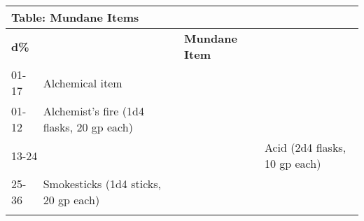 \vspace{12pt}
\begin{longtable}{llll}
\hline
\multicolumn{2}{|p{4.033in}|}{\begin{minipage}[t]{4.033in}\raggedright
\textbf{Table: Mundane Items}\end{minipage}}\\
\hline
\multicolumn{2}{p{0.139in}|}{\begin{minipage}[t]{0.139in}\raggedright
\textbf{d\%}\end{minipage}} & \multicolumn{1}{|p{0.896in}|}{\begin{minipage}[t]{0.896in}\raggedright
\textbf{Mundane Item}\end{minipage}}\\
\hline
\multicolumn{1}{p{3.137in}|}{\begin{minipage}[t]{3.137in}\raggedright
01-17\end{minipage}} & \multicolumn{1}{p{0.069in}|}{\begin{minipage}[t]{0.069in}\raggedright
Alchemical item\end{minipage}}\\
\hline
\multicolumn{1}{p{0.069in}|}{\begin{minipage}[t]{0.069in}\raggedright
01-12\end{minipage}} & \multicolumn{1}{|p{0.896in}|}{\begin{minipage}[t]{0.896in}\raggedright
Alchemist's fire (1d4 flasks, 20 gp each)\end{minipage}}\\
\hline
\multicolumn{3}{p{3.276in}|}{\begin{minipage}[t]{3.276in}\raggedright
13-24\end{minipage}} & \multicolumn{1}{p{0.069in}|}{\begin{minipage}[t]{0.069in}\raggedright
Acid (2d4 flasks, 10 gp each)\end{minipage}}\\
\hline
\multicolumn{1}{p{0.069in}|}{\begin{minipage}[t]{0.069in}\raggedright
25-36\end{minipage}} & \multicolumn{1}{|p{0.896in}|}{\begin{minipage}[t]{0.896in}\raggedright
Smokesticks (1d4 sticks, 20 gp each)\end{minipage}}\\
\hline
\multicolumn{3}{p{3.276in}|}{\begin{minipage}[t]{3.276in}\raggedright

\end{minipage}}
\end{longtable}
